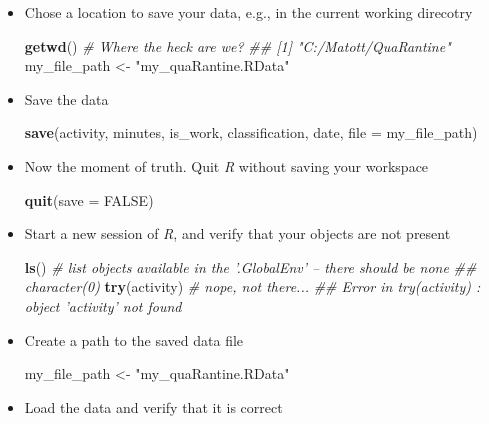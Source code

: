 \documentclass[
]{book}
\newenvironment{Shaded}{\begin{snugshade}}{\end{snugshade}}
\newcommand{\CommentTok}[1]{\textcolor[rgb]{0.56,0.35,0.01}{\textit{#1}}}
\newcommand{\DataTypeTok}[1]{\textcolor[rgb]{0.13,0.29,0.53}{#1}}
\newcommand{\KeywordTok}[1]{\textcolor[rgb]{0.13,0.29,0.53}{\textbf{#1}}}
\newcommand{\NormalTok}[1]{#1}
\newcommand{\OtherTok}[1]{\textcolor[rgb]{0.56,0.35,0.01}{#1}}
\newcommand{\StringTok}[1]{\textcolor[rgb]{0.31,0.60,0.02}{#1}}
\begin{document}
\begin{itemize}
\item
  Chose a location to save your data, e.g., in the current working direcotry

\begin{Shaded}
\begin{Highlighting}[]
\KeywordTok{getwd}\NormalTok{()    }\CommentTok{# Where the heck are we?}
\CommentTok{## [1] "C:/Matott/QuaRantine"}
\NormalTok{my_file_path <-}\StringTok{ "my_quaRantine.RData"}
\end{Highlighting}
\end{Shaded}
\item
  Save the data

\begin{Shaded}
\begin{Highlighting}[]
\KeywordTok{save}\NormalTok{(activity, minutes, is_work, classification, date, }\DataTypeTok{file =}\NormalTok{ my_file_path)}
\end{Highlighting}
\end{Shaded}
\item
  Now the moment of truth. Quit \emph{R} without saving your workspace

\begin{Shaded}
\begin{Highlighting}[]
\KeywordTok{quit}\NormalTok{(}\DataTypeTok{save =} \OtherTok{FALSE}\NormalTok{)}
\end{Highlighting}
\end{Shaded}
\item
  Start a new session of \emph{R}, and verify that your objects are not present

\begin{Shaded}
\begin{Highlighting}[]
\KeywordTok{ls}\NormalTok{() }\CommentTok{# list objects available in the '.GlobalEnv' -- there should be none}
\CommentTok{## character(0)}
\KeywordTok{try}\NormalTok{(activity) }\CommentTok{# nope, not there...}
\CommentTok{## Error in try(activity) : object 'activity' not found}
\end{Highlighting}
\end{Shaded}
\item
  Create a path to the saved data file

\begin{Shaded}
\begin{Highlighting}[]
\NormalTok{my_file_path <-}\StringTok{ "my_quaRantine.RData"}
\end{Highlighting}
\end{Shaded}
\item
  Load the data and verify that it is correct


\end{itemize}
\end{document}
